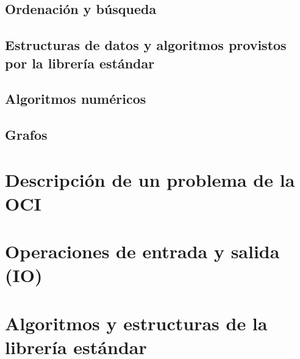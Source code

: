 \documentclass{article}
\begin{document}
\subsection{Ordenación y búsqueda}


\subsection{Estructuras de datos y algoritmos provistos por la librería estándar}


\subsection{Algoritmos numéricos}


\subsection{Grafos}


\newpage
\appendix
\section{Descripción de un problema de la OCI}
\label{problem-description}


\section{Operaciones de entrada y salida (IO)}
\label{tech-IO}


\section{Algoritmos y estructuras de la librería estándar}

\end{document}
